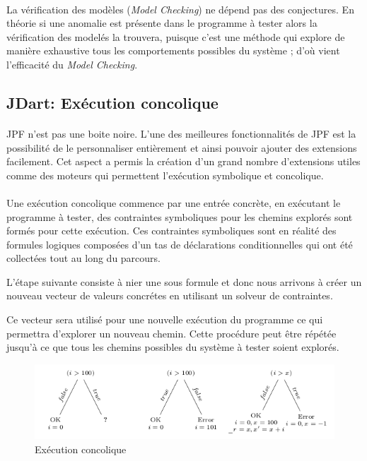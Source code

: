 			\paragraph{}
				La vérification des modèles (\textit{Model Checking}) ne dépend pas des conjectures. En théorie si une anomalie est présente dans le programme à tester
				alors la vérification des modelés la trouvera, puisque c'est une méthode qui explore de manière exhaustive tous les comportements possibles du système ;
				d'où vient l'efficacité du \textit{Model Checking}.
		\subsection{JDart: Exécution concolique}
			\nocite{JDart}
			\nocite{JDart2}

			\paragraph{}
				\gls{JPF} n'est pas une boite noire. L'une des meilleures fonctionnalités de \gls{JPF} est la possibilité de le personnaliser entièrement et ainsi pouvoir ajouter des extensions facilement.
				Cet aspect a permis la création d'un grand nombre d'extensions utiles comme des moteurs
				qui permettent l'exécution symbolique et concolique.

			\paragraph{}
				Une exécution concolique commence par une entrée concrète, en exécutant le programme à tester, des contraintes symboliques pour les chemins explorés
				sont formés pour cette exécution. Ces contraintes symboliques sont en réalité des formules logiques composées d'un tas de déclarations conditionnelles
				qui ont été collectées tout au long du parcours.

				L'étape suivante consiste à nier une sous formule et donc nous arrivons à créer un nouveau vecteur de valeurs concrétes en utilisant un
				solveur de contraintes.

				Ce vecteur sera utilisé pour une nouvelle exécution du programme ce qui permettra d'explorer un nouveau chemin.
				Cette procédure peut être répétée jusqu'à ce que tous les chemins possibles du système à tester soient explorés.
				
			\begin{figure}[H]
				\centering
					\includegraphics[scale=0.5]{images/concolic.png}
				\caption{Exécution concolique}
			\end{figure}
				

